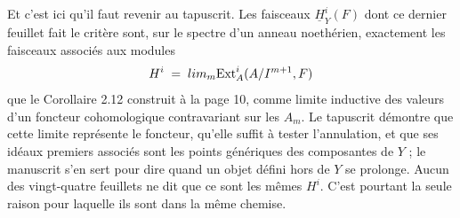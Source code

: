 \documentclass[11pt,a4paper]{article}
\begin{document}
Et c'est ici qu'il faut revenir au tapuscrit. Les faisceaux
$\underline{H}^{i}_{Y}(F)$ dont ce dernier feuillet fait le critère sont, sur le
spectre d'un anneau noethérien, exactement les faisceaux associés aux modules
\[
  H^{i} \;=\; \varinjlim_{m} \mathrm{Ext}^{i}_{A}(A/I^{m+1}, F)
\]
que le Corollaire 2.12 construit à la page 10, comme limite inductive des
valeurs d'un foncteur cohomologique contravariant sur les $A_{m}$. Le tapuscrit
démontre que cette limite représente le foncteur, qu'elle suffit à tester
l'annulation, et que ses idéaux premiers associés sont les points génériques des
composantes de $Y$ ; le manuscrit s'en sert pour dire quand un objet défini hors
de $Y$ se prolonge. Aucun des vingt-quatre feuillets ne dit que ce sont les
mêmes $H^{i}$. C'est pourtant la seule raison pour laquelle ils sont dans la
même chemise.
\end{document}
